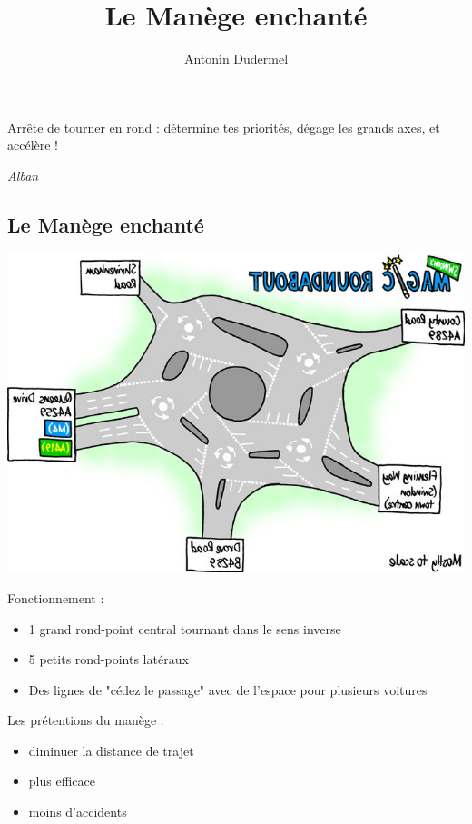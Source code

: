 \documentclass[slidetop,11pt]{beamer}
\title{Le Manège enchanté}
\date{}
\author{Antonin Dudermel}
\begin{document}

\frame{\titlepage}

\begin{frame}
	\epigraph{Arrête de tourner en rond : détermine tes priorités, dégage les grands axes, et accélère !}{\it Alban}
\end{frame}

\begin{frame}
	\tableofcontents
\end{frame}

\begin{frame}
	\section{Le Manège enchanté}
	\begin{center}
		\includegraphics[scale=0.4]{magic}
	\end{center}
\end{frame}

\begin{frame}
	Fonctionnement :
	\begin{itemize}
		\item 1 grand rond-point central tournant dans le sens inverse
		\item 5 petits rond-points latéraux
		\item Des lignes de "cédez le passage" avec de l'espace pour plusieurs voitures
	\end{itemize}
\end{frame}

\begin{frame}
	Les prétentions du manège :
	\begin{itemize}
		\item diminuer la distance de trajet
		\item plus efficace
		\item moins d'accidents
	\end{itemize}
\end{frame}
\end{document}
